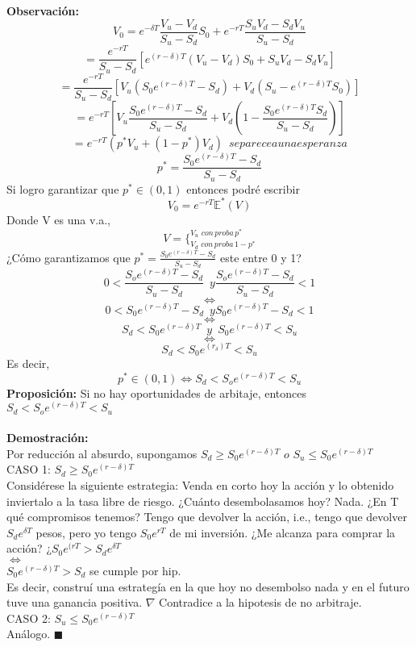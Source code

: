 \documentclass[12pts]{extarticle}
\begin{document}
\textbf{Observación:}
$$ V_0 = e^{-\delta T} \frac{V_u-V_d}{S_u-S_d}S_0 + e^{-rT} \frac{S_uV_d -S_d V_u}{S_u-S_d}$$ 
$$=\frac{e^{-rT}}{S_u-S_d}[e^{(r-\delta)T}(V_u-V_d)S_0 +S_uV_d-S_dV_u]$$
$$=\frac{e^{-rT}}{S_u-S_d}[V_u(S_0 e^{(r-\delta)T}-S_d)+V_d(S_u-e^{(r-\delta)T}S_0)]$$
$$=e^{-rT}[V_u \frac{S_0 e^{(r-\delta)T}-S_d}{S_u-S_d}+V_d(1-\frac{S_0e^{(r-\delta)T}S_d}{S_u-S_d})]$$
$$=e^{-rT}(p^{*}V_u+(1-p^{*})V_d)  \, \, \, se parece a una esperanza$$ 
$$p^{*}=\frac{S_0 e^{(r-\delta)T}-S_d}{S_u-S_d}$$ 
Si logro garantizar que $p^{*} \in (0,1)$ entonces podré escribir 
$$V_0=e^{-rT}\mathbb{E}^{*}(V)$$
Donde V es una v.a., 
$$V=\Bigg \{_{V_d \, \, con \,proba\, 1-p^{*}}^{V_u \, \, con\, proba\, p^{*}}$$
¿Cómo garantizamos que $p^{*}=\frac{S_0 e^{(r-\delta)T}-S_d}{S_u-S_d}$ este entre 0 y 1? 
$$0<\frac{S_o e^{(r-\delta)T}-S_d}{S_u-S_d} \, \, \, y  \frac{S_o e^{(r-\delta)T}-S_d}{S_u-S_d}<1$$
$$\Leftrightarrow$$ 
$$ 0< S_0 e^{(r-\delta)T}-S_d \, \, \, y S_0 e^{(r-\delta)T}-S_d<1$$
$$\Leftrightarrow$$
$$S_d <S_0e^{(r-\delta)T} \, \, \, y \, \, \, S_0e^{(r-\delta)T}<S_u$$
$$\Leftrightarrow$$
$$S_d<S_0e^{(r_\delta)T}<S_u$$
Es decir, 
$$p^{*} \in (0,1) \Leftrightarrow S_d<S_oe^{(r-\delta)T}<S_u$$
\textbf{Proposición:} Si no hay oportunidades de arbitaje, entonces $ S_d<S_oe^{(r-\delta)T}<S_u $ \\ \\ 
\textbf{Demostración:}\\ 
 Por reducción al absurdo, supongamos $S_d \geq S_0 e^{(r-\delta)T} \,\, o \,\,  S_u \leq S_0 e^{(r-\delta)T}$  \\
CASO 1: $S_d \geq S_0 e^{(r-\delta)T}$ 
\\ 
Considérese la siguiente estrategia: Venda en corto hoy la acción y lo obtenido inviertalo a la tasa libre de riesgo. ¿Cuánto desembolasamos hoy? Nada.
¿En T qué compromisos tenemos? Tengo que devolver la acción, i.e., tengo que devolver $S_d e^{\delta T}$ pesos, pero yo tengo $S_0 e^{rT}$ de mi inversión. 
¿Me alcanza para comprar la acción? ¿$S_0e^{(rT} > S_de^{\delta T}$ \\ $\Leftrightarrow$ \\ $S_0e^{(r-\delta)T}>S_d$ se cumple por hip. \\
Es decir, construí una estrategía en la que hoy no desembolso nada y en el futuro tuve una ganancia positiva. $\nabla$ Contradice a la hipotesis de no arbitraje. 
\\ 
CASO 2: $S_u \leq S_0 e^{(r-\delta)T}$ 
\\ Análogo. $\blacksquare$ 
\\ \\ 
\end{document}
